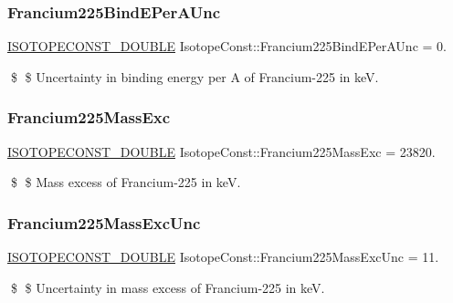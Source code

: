 \subsubsection{\texorpdfstring{Francium225\+Bind\+E\+Per\+A\+Unc}{Francium225BindEPerAUnc}}
{\footnotesize\ttfamily \mbox{\hyperlink{group___isotope_const-_macros_ga8f45a7272ce02c0b4c65c44636ed719a}{I\+S\+O\+T\+O\+P\+E\+C\+O\+N\+S\+T\+\_\+\+D\+O\+U\+B\+LE}} Isotope\+Const\+::\+Francium225\+Bind\+E\+Per\+A\+Unc = 0.}

\$ \$ Uncertainty in binding energy per A of Francium-\/225 in keV. \mbox{\label{group___isotope_const-_francium-_fr225_ga6eebdc1cffaa43f16ecb7547862a4bd1}} 
\subsubsection{\texorpdfstring{Francium225\+Mass\+Exc}{Francium225MassExc}}
{\footnotesize\ttfamily \mbox{\hyperlink{group___isotope_const-_macros_ga8f45a7272ce02c0b4c65c44636ed719a}{I\+S\+O\+T\+O\+P\+E\+C\+O\+N\+S\+T\+\_\+\+D\+O\+U\+B\+LE}} Isotope\+Const\+::\+Francium225\+Mass\+Exc = 23820.}

\$ \$ Mass excess of Francium-\/225 in keV. \mbox{\label{group___isotope_const-_francium-_fr225_ga1bd18bf040ca4fd4582d1409361873d9}} 
\subsubsection{\texorpdfstring{Francium225\+Mass\+Exc\+Unc}{Francium225MassExcUnc}}
{\footnotesize\ttfamily \mbox{\hyperlink{group___isotope_const-_macros_ga8f45a7272ce02c0b4c65c44636ed719a}{I\+S\+O\+T\+O\+P\+E\+C\+O\+N\+S\+T\+\_\+\+D\+O\+U\+B\+LE}} Isotope\+Const\+::\+Francium225\+Mass\+Exc\+Unc = 11.}

\$ \$ Uncertainty in mass excess of Francium-\/225 in keV. \mbox{\label{group___isotope_const-_francium-_fr225_gad99967a94df3a84cc91730ea10c2323f}} 
